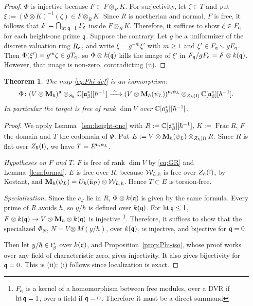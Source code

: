 \documentclass{article}
\theoremstyle{plain}
\newtheorem{theorem}{Theorem}[section]
\theoremstyle{definition}
\theoremstyle{remark}
\numberwithin{equation}{section}
\begin{document}
\begin{proof}
$\Phi$ is injective because $F\subset F\otimes_RK$. For surjectivity, let $\zeta\in T$ and put $\xi:=(\Phi\otimes K)^{-1}(\zeta)\in F\otimes_RK$. Since $R$ is noetherian and normal, $F$ is free, it follows that $F=\bigcap_{\operatorname{ht}\mathfrak q=1}F_\mathfrak q$ inside $F\otimes_RK$. Therefore, it suffices to show $\xi\in F_\mathfrak q$ for each height-one prime $\mathfrak q$. Suppose the contrary. Let $g$ be a uniformizer of the discrete valuation ring $R_\mathfrak q$, and write $\xi=g^{-m}\xi'$ with $m\ge1$ and $\xi'\in F_\mathfrak q\smallsetminus gF_\mathfrak q$. Then $\Phi(\xi')=g^m\zeta\in gT_\mathfrak q$, so $\Phi\otimes k(\mathfrak q)$ kills the image of $\xi'$ in $F_\mathfrak q/gF_\mathfrak q=F\otimes k(\mathfrak q)$. However, that image is non-zero, contradicting (ii).
\end{proof}

\begin{theorem}\label{thm:full-faithful}
The map \eqref{eq:Phi-def} is an isomorphism:
\begin{equation}\label{eq:case2-alg}
\Phi\colon(V\otimes\bM_\hbar)^{\fraku}\otimes_{\Sh}\Cbe[\hbar^{-1}]\xrightarrow{\ \sim\ }(V\otimes\bM_\hbar(\psiL))^{\fraku,\psiL}\otimes_{\Zh(\frakl)}\Cbe[\hbar^{-1}] .
\end{equation}
In particular the target is free of rank $\dim V$ over $\mathbb{C}[\mathfrak{a}^*_{\beta}][\hbar^{-1}]$.
\end{theorem}

\begin{proof}
We apply Lemma~\ref{lem:height-one} with $R:=\mathbb{C}[\mathfrak{a}^*_{\beta}][\hbar^{-1}]$, $K:=\operatorname{Frac}R$, $F$ the domain and $T$ the codomain of $\Phi$. Put $E:=V\otimes\mathbf{M}_\hbar(\psi_L)\otimes_{Z_\hbar(\mathfrak{l})}R$. Since $R$ is flat over $Z_\hbar(\mathfrak{l})$, we have $T=E^{\mathfrak{u},\psi_L}$.

\emph{Hypotheses on $F$ and $T$.} $F$ is free of rank $\dim V$ by \eqref{eq:GR} and Lemma~\ref{lem:formal}. $E$ is free over $R$, because $\mathcal{W}_{L,\hbar}$ is free over $Z_\hbar(\mathfrak{l})$, by Kostant, and $\mathbf{M}_\hbar(\psi_L)=U_\hbar(\bar{\mathfrak{u}}_P)\otimes\mathcal{W}_{L,\hbar}$. Hence $T\subset E$ is torsion-free.

\emph{Specialization.} Since the $c_J$ lie in $R$, $\Phi\otimes k(\mathfrak q)$ is given by the same formula. Every prime of $R$ avoids $\hbar$, so $y/\hbar$ is defined over $k(\mathfrak q)$. For $\operatorname{ht}\mathfrak q\le1$, $F\otimes k(\mathfrak q)\to V\otimes\mathbf{M}_\hbar\otimes k(\mathfrak q)$ is injective \footnote{$F_\mathfrak q$ is a kernel of a homomorphism between free modules, over a  DVR if $\operatorname{ht}\mathfrak q =1$, over a field if $\mathfrak q =0$.  Therefore it must be a direct summand}. Therefore, it suffices to show that the specialized $\Phi_N$, $N=V\otimes M(y/\hbar)$, over $k(\mathfrak q)$, is injective, and bijective for $\mathfrak q=0$.

Then let $y/\hbar\in\mathfrak{t}^*_\beta$ over $k(\mathfrak q)$, and Proposition~\ref{prop:Phi-iso}, whose proof works over any field of characteristic zero, gives injectivity. It also gives bijectivity for $\mathfrak q=0$. This is (ii); (i) follows since localization is exact.
\end{proof}
\end{document}

